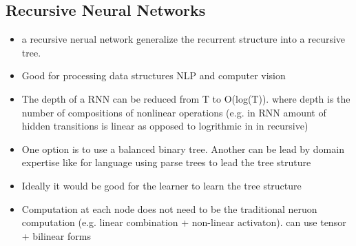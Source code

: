\documentclass[11pt]{article}
\begin{document}
\subsection{Recursive Neural Networks}
\label{sec:orgf22a960}
\begin{itemize}
\item a recursive nerual network generalize the recurrent structure into a recursive tree.
\item Good for processing data structures NLP and computer vision
\item The depth of a RNN can be reduced from T to O(log(T)). where depth is the number of compositions of nonlinear operations (e.g. in RNN amount of hidden transitions is linear as opposed to logrithmic in in recursive)
\item One option is to use a balanced binary tree. Another can be lead by domain expertise like for language using parse trees to lead the tree struture
\item Ideally it would be good for the learner to learn the tree structure
\item Computation at each node does not need to be the traditional neruon computation (e.g. linear combination + non-linear activaton). can use tensor + bilinear forms
\end{itemize}
\end{document}
